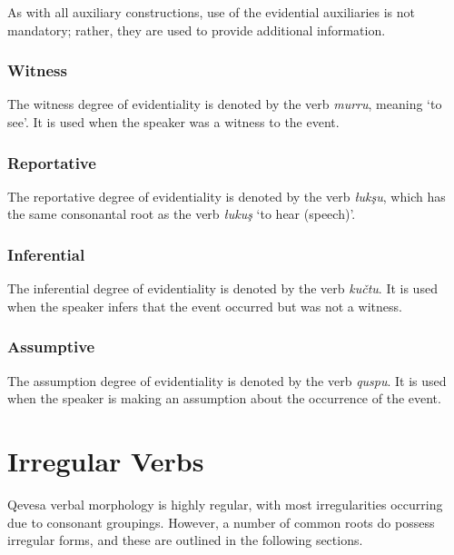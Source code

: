 \documentclass[grammar]{subfiles}
\begin{document}
	As with all auxiliary constructions, use of the evidential auxiliaries is not mandatory; rather, they are used to provide additional information. 

	\subsubsection{Witness}
	\label{sssec:vm_evd_witness}

	The witness degree of evidentiality is denoted by the verb \textit{murru}, meaning ‘to see’. It is used when the speaker was a witness to the event.

	\subsubsection{Reportative}
	\label{sssec:vm_evd_reportative}

	The reportative degree of evidentiality is denoted by the verb \textit{łukşu}, which has the same consonantal root as the verb \textit{łukuş} ‘to hear (speech)’.

	\subsubsection{Inferential}
	\label{sssec:vm_evd_inferential}

	The inferential degree of evidentiality is denoted by the verb \textit{kučtu}. It is used when the speaker infers that the event occurred but was not a witness.

	\subsubsection{Assumptive}
	\label{sssec:vm_evd_assumption}

	The assumption degree of evidentiality is denoted by the verb \textit{quspu}. It is used when the speaker is making an assumption about the occurrence of the event.

	\section{Irregular Verbs}
	\label{sec:vm_irregular}

	Qevesa verbal morphology is highly regular, with most irregularities occurring due to consonant groupings. %
	However, a number of common roots do possess irregular forms, and these are outlined in the following sections.
\end{document}
